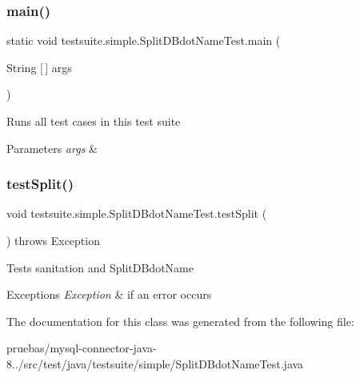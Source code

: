 \subsubsection{\texorpdfstring{main()}{main()}}
{\footnotesize\ttfamily static void testsuite.\+simple.\+Split\+D\+Bdot\+Name\+Test.\+main (\begin{DoxyParamCaption}\item[{String \mbox{[}$\,$\mbox{]}}]{args }\end{DoxyParamCaption})\hspace{0.3cm}{\ttfamily [static]}}

Runs all test cases in this test suite


\begin{DoxyParams}{Parameters}
{\em args} & \\
\hline
\end{DoxyParams}
\mbox{\label{classtestsuite_1_1simple_1_1_split_d_bdot_name_test_a079789e05d1272485f650f92c91777fa}} 
\subsubsection{\texorpdfstring{test\+Split()}{testSplit()}}
{\footnotesize\ttfamily void testsuite.\+simple.\+Split\+D\+Bdot\+Name\+Test.\+test\+Split (\begin{DoxyParamCaption}{ }\end{DoxyParamCaption}) throws Exception}

Tests sanitation and Split\+D\+Bdot\+Name


\begin{DoxyExceptions}{Exceptions}
{\em Exception} & if an error occurs \\
\hline
\end{DoxyExceptions}


The documentation for this class was generated from the following file\+:\begin{DoxyCompactItemize}
\item 
pruebas/mysql-\/connector-\/java-\/8../src/test/java/testsuite/simple/Split\+D\+Bdot\+Name\+Test.\+java\end{DoxyCompactItemize}
